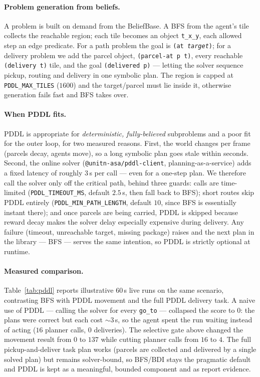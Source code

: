 \paragraph{Problem generation from beliefs.} A problem is built on demand from
the BeliefBase. A BFS from the agent's tile collects the reachable region; each
tile becomes an object \texttt{t\_x\_y}, each allowed step an edge predicate.
For a path problem the goal is \texttt{(at \emph{target})}; for a delivery
problem we add the parcel object, \texttt{(parcel-at p t)}, every reachable
\texttt{(delivery t)} tile, and the goal \texttt{(delivered p)} --- letting the
solver sequence pickup, routing and delivery in one symbolic plan. The region is
capped at \texttt{PDDL\_MAX\_TILES} ($1600$) and the target/parcel must lie
inside it, otherwise generation fails fast and BFS takes over.

\paragraph{When PDDL fits.} PDDL is appropriate for
\emph{deterministic, fully-believed} subproblems and a poor fit for the outer
loop, for two measured reasons. First, the world changes per frame (parcels
decay, agents move), so a long symbolic plan goes stale within seconds.
Second, the online solver (\texttt{@unitn-asa/pddl-client}, planning-as-a-service)
adds a fixed latency of roughly $3$\,s per call --- even for a one-step plan.
We therefore call the solver only off the critical path, behind three guards:
calls are time-limited (\texttt{PDDL\_TIMEOUT\_MS}, default $2.5$\,s, then fall
back to BFS); short routes skip PDDL entirely (\texttt{PDDL\_MIN\_PATH\_LENGTH},
default $10$, since BFS is essentially instant there); and once parcels are
being carried, PDDL is skipped because reward decay makes the solver delay
especially expensive during delivery. Any failure
(timeout, unreachable target, missing package) raises and the next plan in the
library --- BFS --- serves the same intention, so PDDL is strictly optional at
runtime.

\paragraph{Measured comparison.} Table~\ref{tab:pddl} reports illustrative
$60$\,s live runs on the same scenario, contrasting BFS with PDDL movement and
the full PDDL delivery task. A naive use of PDDL --- calling the solver for
every \texttt{go\_to} --- collapsed the score to $0$: the plans were correct but
each cost $\sim 3$\,s, so the agent spent the run waiting instead of acting
($16$ planner calls, $0$ deliveries). The selective gate above changed the
movement result from $0$ to $137$ while cutting planner calls from $16$ to $4$.
The full pickup-and-deliver task plan works (parcels are collected and
delivered by a single solved plan) but remains solver-bound, so BFS/BDI stays
the pragmatic default and PDDL is kept as a meaningful, bounded component and as
report evidence.

